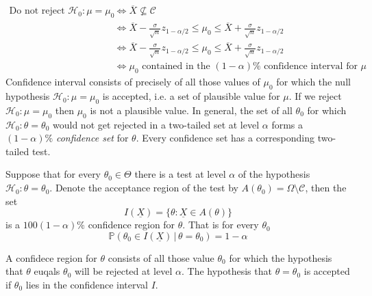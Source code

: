 \documentclass[11pt]{article}
\begin{document}
\begin{example}
\begin{enumerate}
\begin{align*}
        \text{Do not reject }\mathcal{H}_0: \mu = \mu_0 &\iff \overline{X}\not\subseteq \mathcal{C}\\
        &\iff \overline{X} - \frac{\sigma}{\sqrt{n}} z_{1-\alpha/2} \leq \mu_0 \leq \overline{X} + \frac{\sigma}{\sqrt{n}} z_{1-\alpha/2}\\
        &\iff \overline{X} - \frac{\sigma}{\sqrt{n}}z_{1 - \alpha/2} \leq \mu_0 \leq \overline{X} + \frac{\sigma}{\sqrt{n}}z_{1 - \alpha/2}\\
        &\iff \mu_0 \text{ contained in the } (1 - \alpha)\% \text{ confidence interval for } \mu
    \end{align*}
     Confidence interval consists of precisely of all those values of $\mu_0$ for which the null hypothesis $\mathcal{H}_0: \mu = \mu_0$ is accepted, i.e. a set of plausible value for $\mu$. If we reject $\mathcal{H}_0:\mu = \mu_0$ then $\mu_0$ is not a plausible value. In general, the set of all $\theta_0$ for which $\mathcal{H}_0: \theta = \theta_0$ would not get rejected in a two-tailed set at level $\alpha$ forms a $(1-\alpha)\%$ \textit{confidence set} for $\theta$. Every confidence set has a corresponding two-tailed test.
  \end{enumerate}
\end{example}


\begin{theorem*}
  Suppose that for every $\theta_0 \in \Theta$ there is a test at level $\alpha$ of the hypothesis $\mathcal{H}_0: \theta = \theta_0$. Denote the acceptance region of the test by $A(\theta_0) = \Omega \setminus \mathcal{C}$, then the set
  \[
    I(\underline{X})=  \{ \theta: \underline{X} \in A(\theta)\}
  \]
  is a $100(1-\alpha)\%$ confidence region for $\theta$. That is for every $\theta_0$
  \[
    \mathbb{P}(\theta_0 \in I(\underline{X})\, | \, \theta = \theta_0) = 1 - \alpha
  \]
  \begin{rem}
    A confidece region for $\theta$ consists of all those value $\theta_0$ for which the hypothesis that $\theta$ euqals $\theta_0$ will be rejected at level $\alpha$. The hypothesis that $\theta = \theta_0$ is accepted if $\theta_0$ lies in the confidence interval $I$.
  \end{rem}
\end{theorem*}
\end{document}
